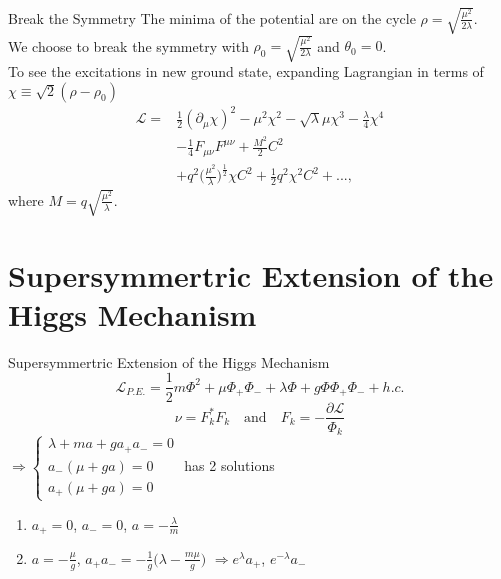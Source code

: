 \documentclass{beamer}
\newcommand{\Lagr}{\mathcal{L}}
\begin{document}
\begin{frame}{Break the Symmetry}
    The minima of the potential are on the cycle $\rho=\sqrt{\frac{\mu^2}{2\lambda}}$.\\
    We choose to break the symmetry with $\rho_0=\sqrt{\frac{\mu^2}{2\lambda}}$ and $\theta_0=0$.\\
    To see the excitations in new ground state, expanding Lagrangian in terms of $\chi \equiv \sqrt{2} (\rho-\rho_0) $
    \begin{align*}
        \Lagr =& \frac{1}{2}(\partial_\mu \chi)^2 - \mu^2\chi^2-\sqrt{\lambda}\mu\chi^3-\frac{\lambda}{4}\chi^4\\
        &-\frac{1}{4}F_{\mu\nu }F^{\mu\nu}+\frac{M^2}{2}C^2\\
        &+q^2\bigg(\frac{\mu^2}{\lambda}\bigg)^{\frac{1}{2}}\chi C^2+\frac{1}{2}q^2\chi^2C^2+...,
    \end{align*}
    where $M=q\sqrt{\frac{\mu^2}{\lambda}}$.
\end{frame}

\section{Supersymmertric Extension of the Higgs Mechanism}
\begin{frame}{Supersymmertric Extension of the Higgs Mechanism}
    $$\Lagr_{P.E.}=\frac{1}{2}m\Phi^2 + \mu\Phi_+\Phi_- + \lambda \Phi + g\Phi\Phi_+\Phi_- + h.c.  $$
    $$\nu=F_k^*F_k \quad\text{and}\quad F_k=-\frac{\partial \Lagr}{\Phi_k} $$
    $\Rightarrow
    \begin{cases}
        \lambda+ma+ga_+a_-=0 \\
        a_-(\mu+ga)=0\\
        a_+(\mu+ga)=0
    \end{cases}$
    has 2 solutions 
    \begin{enumerate}
        \item $a_+=0$, $a_-=0$, $a=-\frac{\lambda}{m}$
        \item $a=-\frac{\mu}{g}$,  $a_+a_-=-\frac{1}{g}\bigg(\lambda-\frac{m\mu}{g}\bigg)$
        $\Rightarrow e^\lambda a_+ $, $e^{-\lambda}a_-$
    \end{enumerate}
\end{frame}
\end{document}
